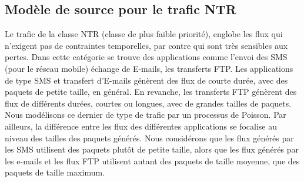 \subsection{Mod\`ele de source pour le trafic NTR}
Le trafic de la classe NTR (classe de plus faible priorit\'e), englobe les flux qui n'exigent pas de contraintes temporelles, par contre qui sont tr\`es sensibles aux pertes. Dans cette cat\'egorie se trouve des applications comme l'envoi des  SMS (pour le r\'eseau mobile) \'echange de E-mails, les transferts FTP. 
Les applications de type SMS et transfert d'E-mails g\'en\`erent des flux de courte dur\'ee, avec des  paquets de petite taille, en g\'en\'eral. En revanche, les transferts FTP g\'en\`erent des flux de diff\'erents dur\'ees, courtes ou longues, avec de grandes tailles de paquets. 
Nous mod\'elisons ce dernier de type de trafic par un processus de Poisson. %
Par ailleurs, la diff\'erence entre les flux des diff\'erentes applications se focalise au niveau des tailles des paquets g\'en\'er\'es. Nous consid\'erons que les flux g\'en\'er\'es par les SMS utilisent des paquets plut\^ot de petite taille, alors que les flux g\'en\'er\'es par les e-mails et les flux FTP utilisent autant des paquets de taille moyenne, que des paquets de taille maximum. 